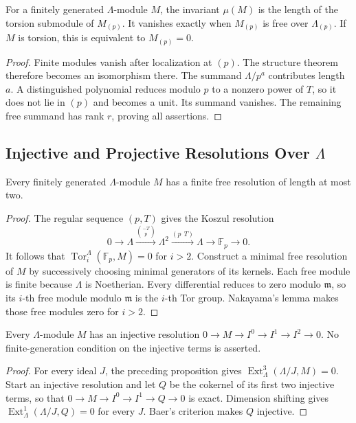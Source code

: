 \begin{corollary}[\(\mu=0\) criterion]
\label{v4-arith:pos:cor:mu-zero-criterion}
For a finitely generated \(\Lambda\)-module \(M\), the invariant
\(\mu(M)\) is the length of the torsion submodule of \(M_{(p)}\).
It vanishes exactly when \(M_{(p)}\) is free over
\(\Lambda_{(p)}\). If \(M\) is torsion, this is equivalent
to \(M_{(p)}=0\).
\end{corollary}
\begin{proof}
Finite modules vanish after localization at \((p)\).
The structure theorem therefore becomes an isomorphism there.
The summand \(\Lambda/p^a\) contributes length \(a\).
A distinguished polynomial reduces modulo \(p\) to a nonzero
power of \(T\), so it does not lie in \((p)\) and becomes a
unit. Its summand vanishes. The remaining free summand has
rank \(r\), proving all assertions.
\end{proof}

\subsection{Injective and Projective Resolutions Over \texorpdfstring{\(\Lambda\)}{Lambda}}
\label{v4-arith:pos:resolutions}

\begin{proposition}
\label{v4-arith:pos:prop:proj-resolution}
Every finitely generated \(\Lambda\)-module \(M\) has a finite
free resolution of length at most two.
\end{proposition}
\begin{proof}
The regular sequence \((p,T)\) gives the Koszul resolution
\[
 0\longrightarrow\Lambda
 \xrightarrow{\binom{-T}{p}}\Lambda^2
 \xrightarrow{(p\ \ T)}\Lambda
 \longrightarrow\mathbb F_p\longrightarrow0.
\]
It follows that \(\operatorname{Tor}_i^\Lambda(\mathbb F_p,M)=0\)
for \(i>2\). Construct a minimal free resolution of \(M\)
by successively choosing minimal generators of its kernels.
Each free module is finite because \(\Lambda\) is Noetherian.
Every differential reduces to zero modulo \(\mathfrak m\),
so its \(i\)-th free module modulo \(\mathfrak m\) is the
\(i\)-th Tor group. Nakayama's lemma makes those free modules
zero for \(i>2\).
\end{proof}

\begin{proposition}
\label{v4-arith:pos:prop:inj-resolution}
Every \(\Lambda\)-module \(M\) has an injective resolution
\(0\to M\to I^0\to I^1\to I^2\to0\).
No finite-generation condition on the injective terms is asserted.
\end{proposition}
\begin{proof}
For every ideal \(J\), the preceding proposition gives
\(\operatorname{Ext}^3_\Lambda(\Lambda/J,M)=0\).
Start an injective resolution and let \(Q\) be the cokernel
of its first two injective terms, so that
\(0\to M\to I^0\to I^1\to Q\to0\) is exact.
Dimension shifting gives
\(\operatorname{Ext}^1_\Lambda(\Lambda/J,Q)=0\) for every \(J\).
Baer's criterion makes \(Q\) injective.
\end{proof}

